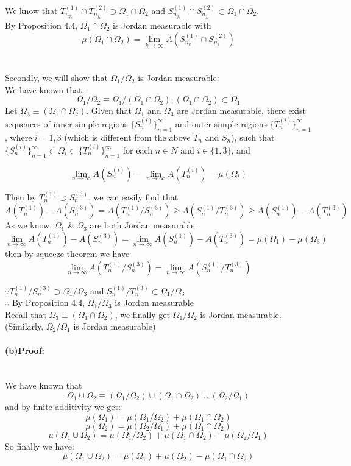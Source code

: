 \documentclass[11pt]{article}
\def\to{\rightarrow}
\begin{document}
We know that $T_{n_{j_k}}^{(1)}\cap T_{n_{j_k}}^{(2)} \supset \Omega_1\cap\Omega_2$ and 
$S_{n_{j_k}}^{(1)}\cap S_{n_{j_k}}^{(2)} \subset \Omega_1\cap\Omega_2$.\\
By Proposition 4.4, $\Omega_1\cap\Omega_2$ is Jordan measurable with
$$\mu (\Omega_1\cap \Omega_2)=\lim_{k\to\infty}A (S_{n_k}^{(1)}\cap S_{n_k}^{(2)})$$
\\ \\
Secondly, we will show that $\Omega_1\slash \Omega_2$ is Jordan measurable:\\
We have known that:
$$\Omega_1\slash \Omega_2\equiv \Omega_1\slash (\Omega_1\cap\Omega_2),(\Omega_1\cap\Omega_2)\subset\Omega_1$$
Let $\Omega_3\equiv (\Omega_1\cap\Omega_2)$.
Given that $\Omega_1$ and $\Omega_3$ are Jordan measurable, there exist sequences
of inner simple regions $\{S_n^{(i)}\}^{\infty }_{n=1}$
and outer simple regions $\{T_n^{(i)}\}^\infty_{n=1}$, where $i = 1, 3$ (which is different from the above $T_n$ and $S_n$), such that
$\{S_n^{(i)}\}^{\infty }_{n=1}\subset \Omega_i \subset \{T_n^{(i)}\}^\infty_{n=1}$  
for each $n \in N$ and  $i \in \{1, 3\}$, and

$$\lim_{n\to\infty}A(S_n^{(i)})=\lim_{n\to\infty}
A(T_n^{(i)})=\mu(\Omega_i)$$

Then by $T_n^{(1)}\supset S_n^{(3)}$,  we can easily find that
$$ A(T_n^{(1)})-A(S_n^{(3)})= A(T_n^{(1)}\slash S_n^{(3)})\geq A(S_n^{(1)}\slash T_n^{(3)}) \geq A(S_n^{(1)})-A(T_n^{(3)}) $$
As we know, $\Omega_1$ \& $\Omega_3$ are both Jordan measurable:
$$\lim_{n\to\infty}A(T_n^{(1)})-A(S_n^{(3)})=\lim_{n\to\infty}A(S_n^{(1)})-A(T_n^{(3)})=\mu(\Omega_1)-\mu(\Omega_3)$$
then by squeeze theorem we have
$$\lim_{n\to\infty} A(T_n^{(1)}\slash S_n^{(3)})=\lim_{n\to\infty} A(S_n^{(1)}\slash T_n^{(3)})$$


$\because T_n^{(1)}\slash S_n^{(3)}\supset \Omega_1\slash\Omega_3$ and 
$S_n^{(1)}\slash T_n^{(3)}\subset \Omega_1\slash\Omega_3$\\
$\therefore $ By Proposition 4.4, $\Omega_1\slash\Omega_3$ is Jordan measurable\\
Recall that $\Omega_3\equiv (\Omega_1\cap\Omega_2)$, 
we finally get $\Omega_1\slash\Omega_2$ is Jordan measurable. (Similarly, $\Omega_2\slash\Omega_1$ is Jordan measurable)



\paragraph{(b)Proof:}\ \\We have known that 
$$\Omega_1\cup \Omega_2\equiv (\Omega_1\slash \Omega_2)
\cup(\Omega_1\cap\Omega_2)\cup(\Omega_2\slash\Omega_1) $$
and by finite additivity we get:
$$\mu(\Omega_1)=\mu(\Omega_1\slash \Omega_2)+\mu(\Omega_1\cap\Omega_2)$$
$$\mu(\Omega_2)=\mu(\Omega_2\slash \Omega_1)+\mu(\Omega_1\cap\Omega_2)$$
$$\mu(\Omega_1\cup \Omega_2)=\mu(\Omega_1\slash \Omega_2)
+\mu(\Omega_1\cap\Omega_2)+\mu(\Omega_2\slash\Omega_1) $$
So finally we have:
$$\mu(\Omega_1\cup\Omega_2)=\mu(\Omega_1)+\mu(\Omega_2)-\mu(\Omega_1\cap\Omega_2)$$
\end{document}
